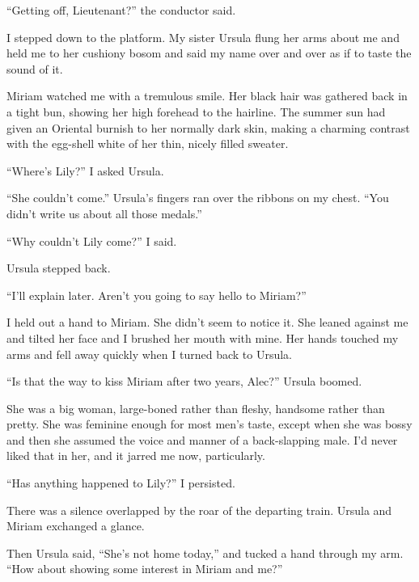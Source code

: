 \documentclass{novel}
\begin{document}
\mainmatter
\cleartorecto
\thispagestyle{empty}
\begin{ChapterStart}
\vspace{3\nbs}
\end{ChapterStart}

“Getting off, Lieutenant?” the conductor said.

I stepped down to the platform. My sister Ursula flung her arms about me and held me to her cushiony bosom and said my name over and over as if to taste the sound of it.

Miriam watched me with a tremulous smile. Her black hair was gathered back in a tight bun, showing her high forehead to the hairline. The summer sun had given an Oriental burnish to her normally dark skin, making a charming contrast with the egg-shell white of her thin, nicely filled sweater.

“Where’s Lily?” I asked Ursula.

“She couldn’t come.” Ursula’s fingers ran over the ribbons on my chest. “You didn’t write us about all those medals.”

“Why couldn’t Lily come?” I said.

Ursula stepped back.

“I’ll explain later. Aren’t you going to say hello to Miriam?”

I held out a hand to Miriam. She didn’t seem to notice it. She leaned against me and tilted her face and I brushed her mouth with mine. Her hands touched my arms and fell away quickly when I turned back to Ursula.

“Is that the way to kiss Miriam after two years, Alec?” Ursula boomed.

She was a big woman, large-boned rather than fleshy, handsome rather than pretty. She was feminine enough for most men’s taste, except when she was bossy and then she assumed the voice and manner of a back-slapping male. I’d never liked that in her, and it jarred me now, particularly.

“Has anything happened to Lily?” I persisted.

There was a silence overlapped by the roar of the departing train. Ursula and Miriam exchanged a glance.

Then Ursula said, “She’s not home today,” and tucked a hand through my arm.  “How about showing some interest in Miriam and me?”
\end{document}
